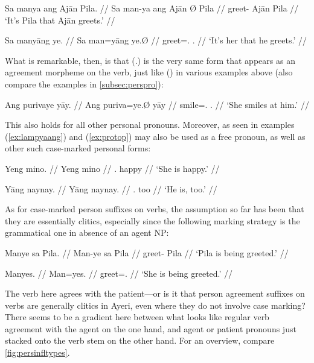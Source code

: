 \pex %
\a\label{ex:fullsntc}\begingl
	\gla Sa manya ang Ajān {} Pila. //
	\glb Sa man-ya ang ​Ajān Ø ​Pila //
	\glc \PatT{} greet-\TsgM{} \Aarg{} ​Ajān \Top{} ​Pila //
	\glft `It's Pila that Ajān greets.' //
\endgl

\a\label{ex:protop}\begingl
	\gla Sa manyāng ye. //
	\glb Sa man=yāng ye.Ø //
	\glc \PatT{} greet=\TsgM{}.\Aarg{} \TsgF{}.\Top{} //
	\glft `It's her that he greets.' //
\endgl

\xe

What is remarkable, then, is that  (\TsgF{}.\Top{}) is the very 
same form that appears as an agreement morpheme on the verb, just like 
 (\TsgM{}) in various examples above (also compare the examples 
in \autoref{subsec:perspro}):

\ex %
\begingl
	\gla Ang purivaye yāy. //
	\glb Ang puriva=ye.Ø yāy //
	\glc \AgtT{} smile=\TsgF{}.\Top{} \TsgM{}.\Loc{} //
	\glft `She smiles at him.' //
\endgl\xe

This also holds for all other personal pronouns. Moreover, 
 as seen in examples (\ref{ex:lampyaang}) and 
(\ref{ex:protop}) may also be used as a free pronoun, as well as other such 
case-marked personal forms:

\pex %
\a\begingl
	\gla Yeng mino. //
	\glb Yeng mino //
	\glc \TsgF{}.\Aarg{} happy //
	\glft `She is happy.' //
\endgl
	
\a\begingl
	\gla Yāng naynay. //
	\glb Yāng naynay. //
	\glc \TsgM{}.\Aarg{} too //
	\glft `He is, too.' //
\endgl

\xe

\label{patagr}
As for case-marked person suffixes on verbs, the assumption so far has been 
that they are essentially clitics, especially since the following marking 
strategy is the grammatical one in absence of an agent NP:

\pex\label{ex:passive} %
\a\label{ex:manye}\begingl
	\gla Manye sa Pila. //
	\glb Man-ye sa ​Pila //
	\glc greet-\TsgF{} \Parg{} ​Pila //
	\glft `Pila is being greeted.' //
\endgl
	
\a\label{ex:manyes}\begingl
	\gla Manyes. //
	\glb Man=yes. //
	\glc greet=\TsgF{}.\Parg{} //
	\glft `She is being greeted.' //
\endgl

\xe

The verb here agrees with the patient---or is it that person agreement 
suffixes on verbs are generally clitics in Ayeri, even where they do not
involve case marking? There seems to be a gradient here between what looks 
like regular verb agreement with the agent on the one hand, and agent or 
patient pronouns just stacked onto the verb stem on the other hand. For an 
overview, compare \autoref{fig:persinfltypes}.

